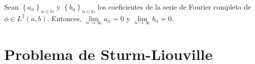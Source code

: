 

\begin{theorem}
    Sean $\left\{a_{n}\right\}_{n\in\mathbb{N}}$ y
    $\left\{b_{n}\right\}_{n\in\mathbb{N}}$ los coeficientes de la
    serie de Fourier completa de $\phi\in L^{2}\left(a,b\right)$.
    Entonces,
    \begin{math}
        \lim\limits_{n\to\infty}
        a_{n}=0
    \end{math}
    y
    \begin{math}
        \lim\limits_{n\to\infty}
        b_{n}=0
    \end{math}.
\end{theorem}

\section{Problema de Sturm-Liouville}

